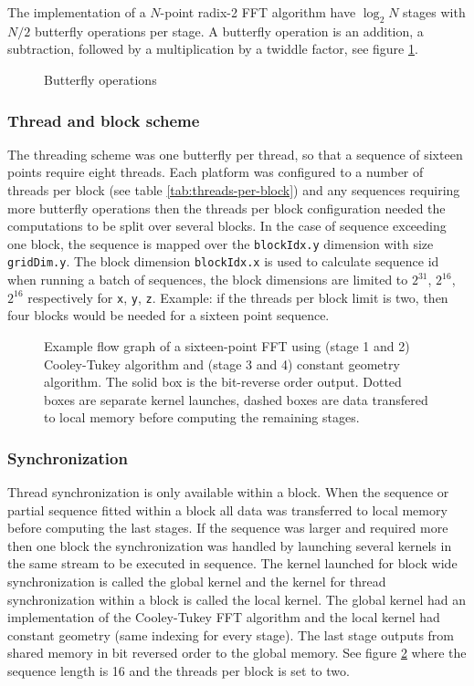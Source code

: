 The implementation of a $N$-point radix-2 FFT algorithm have $\log_2 N$ stages with $N/2$ butterfly operations per stage. A butterfly operation is an addition, a subtraction, followed by a multiplication by a twiddle factor, see figure \ref{fig:butterfly}.
\begin{figure}[h]
	\centering
	
	\caption{Butterfly operations}
	\label{fig:butterfly}
\end{figure}

\subsubsection{Thread and block scheme}

The threading scheme was one butterfly per thread, so that a sequence of sixteen points require eight threads. Each platform was configured to a number of threads per block (see table \ref{tab:threads-per-block}) and any sequences requiring more butterfly operations then the threads per block configuration needed the computations to be split over several blocks. In the case of sequence exceeding one block, the sequence is mapped over the \texttt{blockIdx.y} dimension with size \texttt{gridDim.y}. The block dimension \texttt{blockIdx.x} is used to calculate sequence id when running a batch of sequences, the block dimensions are limited to $2^{31}$, $2^{16}$, $2^{16}$ respectively for \texttt{x}, \texttt{y}, \texttt{z}. Example: if the threads per block limit is two, then four blocks would be needed for a sixteen point sequence.
\begin{figure}
	
	\caption{Example flow graph of a sixteen-point FFT using (stage 1 and 2) Cooley-Tukey algorithm and (stage 3 and 4) constant geometry algorithm. The solid box is the bit-reverse order output. Dotted boxes are separate kernel launches, dashed boxes are data transfered to local memory before computing the remaining stages.}
	\label{fig:flowgraph-16}
\end{figure}

\subsubsection{Synchronization}

Thread synchronization is only available within a block. When the sequence or partial sequence fitted within a block all data was transferred to local memory before computing the last stages. If the sequence was larger and required more then one block the synchronization was handled by launching several kernels in the same stream to be executed in sequence. The kernel launched for block wide synchronization is called the global kernel and the kernel for thread synchronization within a block is called the local kernel. The global kernel had an implementation of the Cooley-Tukey FFT algorithm and the local kernel had constant geometry (same indexing for every stage). The last stage outputs from shared memory in bit reversed order to the global memory. See figure \ref{fig:flowgraph-16} where the sequence length is 16 and the threads per block is set to two.

